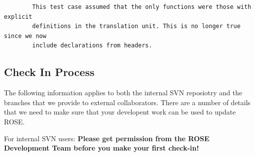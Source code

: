 \begin{enumerate}
{\begin{verbatim}
        This test case assumed that the only functions were those with explicit
        definitions in the translation unit. This is no longer true since we now
        include declarations from headers.
        \end{verbatim} 
    }
  \end{enumerate}


    \subsection{Check In Process}

  The following information applies to both the internal SVN reposiotry and the 
    branches that we provide to external collaborators.  There are a number of details
    that we need to make sure that your developent work can be used to update ROSE.

    For internal SVN users:
    {\bf Please get permission from the ROSE Development Team before you make your first check-in!}

